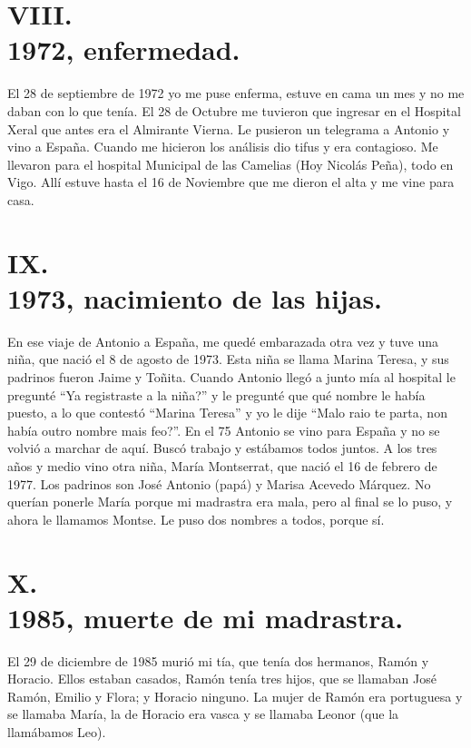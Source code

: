 \documentclass[12pt,a5paper]{book}
\begin{document}
\section*{VIII.\\1972, enfermedad.}

El 28 de septiembre de 1972 yo me puse enferma, estuve en cama un mes y no me daban con lo que tenía. El 28 de Octubre me tuvieron que ingresar en el Hospital Xeral que antes era el Almirante Vierna. Le pusieron un telegrama a Antonio y vino a España. Cuando me hicieron los análisis dio tifus y era contagioso. Me llevaron para el hospital Municipal de las Camelias (Hoy Nicolás Peña), todo en Vigo. Allí estuve hasta el 16 de Noviembre que me dieron el alta y me vine para casa.


\section*{IX.\\1973, nacimiento de las hijas.}

En ese viaje de Antonio a España, me quedé embarazada otra vez y tuve una niña, que nació el 8 de agosto de 1973. Esta niña se llama Marina Teresa, y sus padrinos fueron Jaime y Toñita. Cuando Antonio llegó a junto mía al hospital le pregunté “Ya registraste a la niña?” y le pregunté que qué nombre le había puesto, a lo que contestó “Marina Teresa” y yo le dije “Malo raio te parta, non había outro nombre mais feo?”.
En el 75 Antonio se vino para España y no se volvió a marchar de aquí. Buscó trabajo y estábamos todos juntos.
A los tres años y medio vino otra niña, María Montserrat, que nació el 16 de febrero de 1977. Los padrinos son José Antonio (papá) y Marisa Acevedo Márquez. No querían ponerle María porque mi madrastra era mala, pero al final se lo puso, y ahora le llamamos Montse. Le puso dos nombres a todos, porque sí.

\section*{X.\\1985, muerte de mi madrastra.}

El 29 de diciembre de 1985 murió mi tía, que tenía dos hermanos, Ramón y Horacio. Ellos estaban casados, Ramón tenía tres hijos, que se llamaban José Ramón, Emilio y Flora; y Horacio ninguno. La mujer de Ramón era portuguesa y se llamaba María, la de Horacio era vasca y se llamaba Leonor (que la llamábamos Leo).
\end{document}
